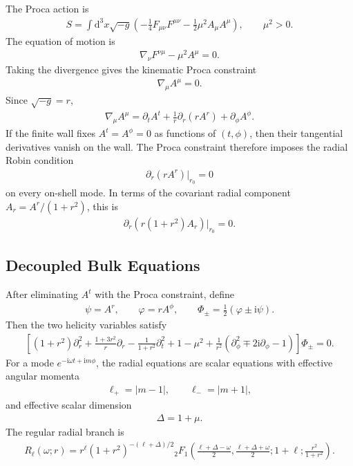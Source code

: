 \documentclass[11pt]{article}
\newcommand{\dd}{\mathrm{d}}
\newcommand{\ii}{\mathrm{i}}
\newcommand{\pd}{\partial}
\begin{document}
The Proca action is
\begin{align}
S=\int\dd^3x\sqrt{-g}\left(
-\frac14 F_{\mu\nu}F^{\mu\nu}-\frac12\mu^2A_\mu A^\mu
\right),\qquad \mu^2>0 .
\end{align}
The equation of motion is
\begin{align}
\nabla_\nu F^{\nu\mu}-\mu^2 A^\mu=0 .
\end{align}
Taking the divergence gives the kinematic Proca constraint
\begin{align}
\nabla_\mu A^\mu=0 .
\end{align}
Since \(\sqrt{-g}=r\),
\begin{align}
\nabla_\mu A^\mu=
\pd_tA^t+\frac1r\pd_r(rA^r)+\pd_\phi A^\phi .
\end{align}
If the finite wall fixes \(A^t=A^\phi=0\) as functions of \((t,\phi)\), then
their tangential derivatives vanish on the wall.  The Proca constraint
therefore imposes the radial Robin condition
\begin{align}
\boxed{\;\pd_r(rA^r)\big|_{r_0}=0\;}
\end{align}
on every on-shell mode.  In terms of the covariant radial component
\(A_r=A^r/(1+r^2)\), this is
\begin{align}
\pd_r\!\left(r(1+r^2)A_r\right)\big|_{r_0}=0 .
\end{align}

\subsection{Decoupled Bulk Equations}

After eliminating \(A^t\) with the Proca constraint, define
\begin{align}
\psi=A^r,\qquad \varphi=rA^\phi,\qquad
\Phi_\pm=\frac12(\varphi\pm \ii\psi).
\end{align}
Then the two helicity variables satisfy
\begin{align}
\left[
(1+r^2)\pd_r^2+\frac{1+3r^2}{r}\pd_r
-\frac{1}{1+r^2}\pd_t^2
+1-\mu^2
+\frac{1}{r^2}\left(\pd_\phi^2\mp2\ii\pd_\phi-1\right)
\right]\Phi_\pm=0 .
\end{align}
For a mode \(e^{-\ii\omega t+\ii m\phi}\), the radial equations are scalar
equations with effective angular momenta
\begin{align}
\ell_+=|m-1|,\qquad \ell_-=|m+1|,
\end{align}
and effective scalar dimension
\begin{align}
\Delta=1+\mu .
\end{align}
The regular radial branch is
\begin{align}
R_\ell(\omega;r)=
r^\ell(1+r^2)^{-(\ell+\Delta)/2}
{}_2F_1\!\left(
\frac{\ell+\Delta-\omega}{2},
\frac{\ell+\Delta+\omega}{2};
1+\ell;
\frac{r^2}{1+r^2}
\right).
\end{align}
\end{document}
